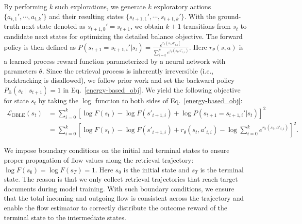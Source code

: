By performing $k$ such explorations, we generate $k$ exploratory actions $\{a_{t,1}', \cdots, a_{t,k}'\}$ and their resulting states $\{s_{t+1,1}', \cdots, s_{t+1,k}'\}$. 
With the ground-truth next state denoted as $s_{t+1,0}' = s_{t+1}$, we obtain $k+1$ transitions from $s_{t}$ to candidate next states for optimizing the detailed balance objective. The forward policy is then defined as $P(s_{t+1}=s_{t+1,i}'|s_{t}) = \frac{e^{r_{\theta}(s_{t},a'_{t,i})}}{\sum_{i=0}^{k}e^{r_{\theta}(s_{t},a'_{t,i})}}$.
Here $r_{\theta}(s, a)$ is a learned process reward function parameterized by a neural network with parameters $\theta$.
Since the retrieval process is inherently irreversible (i.e., backtracking is disallowed), we follow prior work \cite{huamortizing} and set the backward policy $P_{\text{B}}(s_t \mid s_{t+1}) = 1$ in Eq.~\ref{energy-based_obj}. 
We yield the following objective for state $s_{t}$ by taking the $\log$ function to both sides of Eq.~\ref{energy-based_obj}:
\begin{equation} 
\begin{aligned}
\mathcal{L}_{\text{DBLE}}(s_{t})&=\sum_{i=0}^{k}[\log{F(s_{t})}-\log{F(s'_{t+1,i})}+\log{P(s_{t+1}=s_{t+1,i}'|s_{t})}]^{2}\\
&=\sum_{i=0}^{k}[\log{F(s_{t})}-\log{F(s'_{t+1,i})}+r_{\theta}(s_{t},a'_{t,i})-\log{\sum_{i=0}^{k}e^{r_{\theta}(s_{t},a'_{t,i})}}]^{2}.
\end{aligned}
\label{obj:dble}
\end{equation}

We impose boundary conditions on the initial and terminal states to ensure proper propagation of flow values along the retrieval trajectory: $\log{F(s_{0})}=\log{F(s_{T})}=1$.
Here $s_{0}$ is the initial state and $s_{T}$ is the terminal state. 
The reason is that we only collect retrieval trajectories that reach target documents during model training. 
With such boundary conditions, we ensure that the total incoming and outgoing flow is consistent across the trajectory and enable the flow estimator to correctly distribute the outcome reward of the terminal state to the intermediate states.

